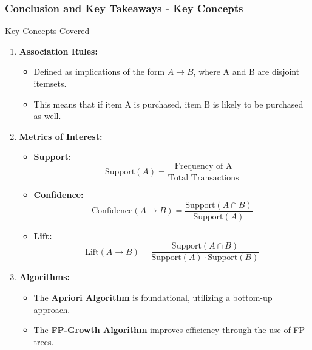 \documentclass[aspectratio=169]{beamer}
\begin{document}
\begin{frame}[fragile]
    \frametitle{Conclusion and Key Takeaways - Key Concepts}
    \begin{block}{Key Concepts Covered}
        \begin{enumerate}
            \item \textbf{Association Rules:}
            \begin{itemize}
                \item Defined as implications of the form \( A \rightarrow B \), where A and B are disjoint itemsets.
                \item This means that if item A is purchased, item B is likely to be purchased as well.
            \end{itemize}
            
            \item \textbf{Metrics of Interest:}
            \begin{itemize}
                \item \textbf{Support:}
                \[
                \text{Support}(A) = \frac{\text{Frequency of A}}{\text{Total Transactions}}
                \]
                
                \item \textbf{Confidence:}
                \[
                \text{Confidence}(A \rightarrow B) = \frac{\text{Support}(A \cap B)}{\text{Support}(A)}
                \]
                
                \item \textbf{Lift:}
                \[
                \text{Lift}(A \rightarrow B) = \frac{\text{Support}(A \cap B)}{\text{Support}(A) \cdot \text{Support}(B)}
                \]
            \end{itemize}
            
            \item \textbf{Algorithms:}
            \begin{itemize}
                \item The \textbf{Apriori Algorithm} is foundational, utilizing a bottom-up approach.
                \item The \textbf{FP-Growth Algorithm} improves efficiency through the use of FP-trees. 
            \end{itemize}
        \end{enumerate}
    \end{block}
\end{frame}
\end{document}
